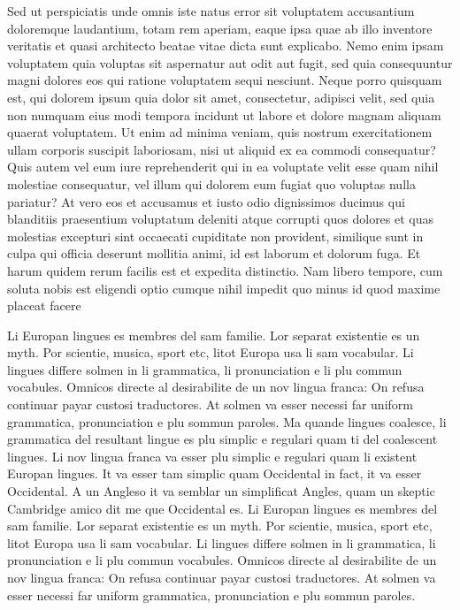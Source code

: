 Sed ut perspiciatis unde omnis iste natus error sit voluptatem accusantium 
doloremque laudantium, totam rem aperiam, eaque ipsa quae ab illo inventore 
veritatis et quasi architecto beatae vitae dicta sunt explicabo. Nemo enim ipsam 
voluptatem quia voluptas sit aspernatur aut odit aut fugit, sed quia 
consequuntur magni dolores eos qui ratione voluptatem sequi nesciunt. Neque 
porro quisquam est, qui dolorem ipsum quia dolor sit amet, consectetur, adipisci 
velit, sed quia non numquam eius modi tempora incidunt ut labore et dolore 
magnam aliquam quaerat voluptatem. Ut enim ad minima veniam, quis nostrum 
exercitationem ullam corporis suscipit laboriosam, nisi ut aliquid ex ea commodi 
consequatur? Quis autem vel eum iure reprehenderit qui in ea voluptate velit 
esse quam nihil molestiae consequatur, vel illum qui dolorem eum fugiat quo 
voluptas nulla pariatur? At vero eos et accusamus et iusto odio dignissimos 
ducimus qui blanditiis praesentium voluptatum deleniti atque corrupti quos 
dolores et quas molestias excepturi sint occaecati cupiditate non provident, 
similique sunt in culpa qui officia deserunt mollitia animi, id est laborum et 
dolorum fuga. Et harum quidem rerum facilis est et expedita distinctio. Nam 
libero tempore, cum soluta nobis est eligendi optio cumque nihil impedit quo 
minus id quod maxime placeat facere 

Li Europan lingues es membres del sam familie. Lor separat existentie es un 
myth. Por scientie, musica, sport etc, litot Europa usa li sam vocabular. Li 
lingues differe solmen in li grammatica, li pronunciation e li plu commun 
vocabules. Omnicos directe al desirabilite de un nov lingua franca: On refusa 
continuar payar custosi traductores. At solmen va esser necessi far uniform 
grammatica, pronunciation e plu sommun paroles. Ma quande lingues coalesce, li 
grammatica del resultant lingue es plu simplic e regulari quam ti del coalescent 
lingues. Li nov lingua franca va esser plu simplic e regulari quam li existent 
Europan lingues. It va esser tam simplic quam Occidental in fact, it va esser 
Occidental. A un Angleso it va semblar un simplificat Angles, quam un skeptic 
Cambridge amico dit me que Occidental es. Li Europan lingues es membres del sam 
familie. Lor separat existentie es un myth. Por scientie, musica, sport etc, 
litot Europa usa li sam vocabular. Li lingues differe solmen in li grammatica, 
li pronunciation e li plu commun vocabules. Omnicos directe al desirabilite de 
un nov lingua franca: On refusa continuar payar custosi traductores. At solmen 
va esser necessi far uniform grammatica, pronunciation e plu sommun paroles. 

